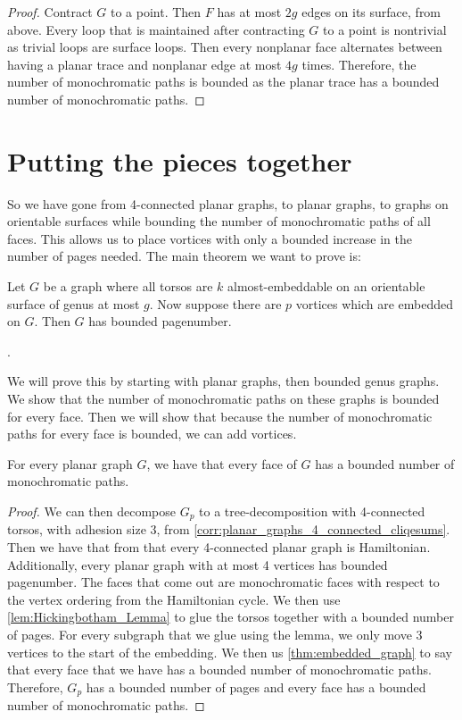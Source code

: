 \begin{proof}
	Contract \(G\) to a point. Then \(F\) has at most \(2g\) edges on its surface, from above. Every loop that is maintained after contracting $G$ to a point is nontrivial as trivial loops are surface loops.
	Then every nonplanar face alternates between having a planar trace and nonplanar edge at most \(4g\) times. Therefore, the number of monochromatic paths is bounded as the planar trace has a bounded number of monochromatic paths. 
\end{proof}

\section{Putting the pieces together}
So we have gone from 4-connected planar graphs, to planar graphs, to graphs on orientable surfaces while bounding the number of monochromatic paths of all faces. This allows us to place vortices with only a bounded increase in the number of pages needed. 
The main theorem we want to prove is:
\begin{theorem}\label{thm:orientablevortices}
	Let $G$ be a graph where all torsos are $k$ almost-embeddable on an orientable surface of genus at most $g$.  Now suppose there are $p$ vortices which are embedded on $G$. Then $G$ has bounded pagenumber.
\end{theorem}
. 

We will prove this by starting with planar graphs, then bounded genus graphs. We show that the number of monochromatic paths on these graphs is bounded for every face. Then we will show that because the number of monochromatic paths for every face is bounded, we can add vortices.

\begin{lemma}\label{lem:planargraphs_monochromatic_paths}
	For every planar graph $G$, we have that every face of $G$ has a bounded number of monochromatic paths.
\end{lemma}
\begin{proof}
	We can then decompose $G_p$ to a tree-decomposition with 4-connected torsos, with adhesion size 3, from \cref{corr:planar_graphs_4_connected_cliqesums}. Then we have that from \textcite{tutteTheoremPlanarGraphs1956} that every 4-connected planar graph is Hamiltonian. Additionally, every planar graph with at most 4 vertices has bounded pagenumber.
	The faces that come out are monochromatic faces with respect to the vertex ordering from the Hamiltonian cycle.
	We then use \cref{lem:Hickingbotham_Lemma} to glue the torsos together with a bounded number of pages. For every subgraph that we glue using the lemma, we only move 3 vertices to the start of the embedding. We then us \cref{thm:embedded_graph} to say that every face that we have has a bounded number of monochromatic paths.
	Therefore, $G_p$ has a bounded number of pages and every face has a bounded number of monochromatic paths. 
\end{proof}


